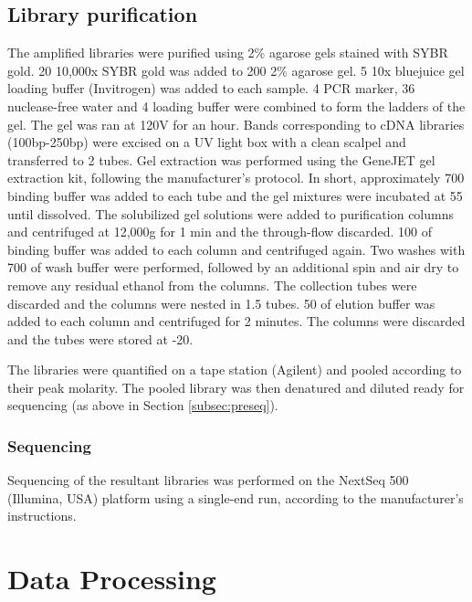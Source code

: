 \subsection{Library purification}
The amplified libraries were purified using 2\% agarose gels stained with SYBR gold.
20\ul{} 10,000x SYBR gold was added to 200\ml{} 2\% agarose gel.
5\ul{} 10x bluejuice gel loading buffer (Invitrogen) was added to each sample.
4\ul{} PCR marker, 36\ul{} nuclease-free water and 4\ul{} loading buffer were combined to form the ladders of the gel.
The gel was ran at 120V for an hour.
Bands corresponding to cDNA libraries (100bp-250bp) were excised on a UV light box with a clean scalpel and transferred to 2\ml{} tubes.
Gel extraction was performed using the GeneJET gel extraction kit, following the manufacturer's protocol.
In short, approximately 700\ul{} binding buffer was added to each tube and the gel mixtures were incubated at 55\C{} until dissolved.
The solubilized gel solutions were added to purification columns and centrifuged at 12,000g for 1 min and the through-flow discarded.
100\ul{} of binding buffer was added to each column and centrifuged again.
Two washes with 700\ul{} of wash buffer were performed, followed by an additional spin and air dry to remove any residual ethanol from the columns.
The collection tubes were discarded and the columns were nested in 1.5\ml{} tubes.
50\ul{} of elution buffer was added to each column and centrifuged for 2 minutes.
The columns were discarded and the tubes were stored at -20\C{}.

The libraries were quantified on a tape station (Agilent) and pooled according to their peak molarity.
The pooled library was then denatured and diluted ready for sequencing (as above in Section \ref{subsec:preseq}).


\subsubsection{Sequencing}
Sequencing of the resultant libraries was performed on the NextSeq 500 (Illumina, USA) platform using a single-end run, according to the manufacturer's instructions.

%

\section{Data Processing}\label{sec:data_processing}
